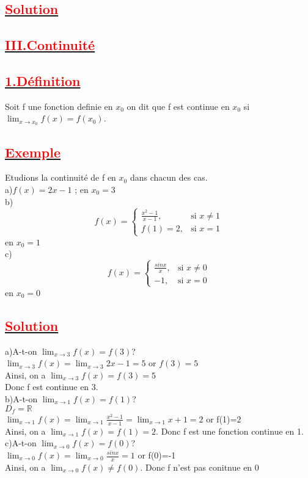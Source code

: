 \documentclass[12pt]{article}
\begin{document}
\subsection*{\underline{\textbf{\textcolor{red}{Solution}}}}
\subsection*{\underline{\textbf{\textcolor{red}{III.Continuité}}}}
\subsection*{\underline{\textbf{\textcolor{red}{1.Définition}}}}
Soit f une fonction definie en $x_{0}$ on dit que f est continue en $x_{0}$ si
$\lim_{x \to x_{0}} f(x)=f(x_{0})$.
\subsection*{\underline{\textbf{\textcolor{red}{Exemple}}}}
Etudions la continuité de f en $x_{0}$ dans chacun des cas.\\
a)$f(x)=2x-1$ ; en $x_{0}=3$\\
b)\[ f(x) = \begin{cases} 
  \frac{x^2-1}{x-1}, & \text{si } x \neq 1 \\
  f(1)=2, & \text{si } x = 1 
\end{cases} \]
en $x_{0}=1$\\
c)\[ f(x) = \begin{cases} 
  \frac{sinx}{x}, & \text{si } x \neq 0 \\
  -1, & \text{si } x=0 
\end{cases} \]
en $x_{0}=0$
\subsection*{\underline{\textbf{\textcolor{red}{Solution}}}}
a)A-t-on $\lim_{x \to 3}f(x)=f(3)$?\\
$\lim_{x \to 3}f(x)=\lim_{x \to 3}2x-1=5$ or $f(3)=5$\\
Ainsi, on a $\lim_{x \to 3}f(x)=f(3)=5$\\
Donc f est continue en 3.\\
b)A-t-on $\lim_{x \to 1}f(x)=f(1)$?\\
$D_{f}=\mathbb{R}$\\
$\lim_{x \to 1}f(x)=\lim_{x \to 1}\frac{x^2-1}{x-1}=\lim_{x \to 1}x+1=2$ or f(1)=2\\
Ainsi, on a $\lim_{x \to 1}f(x)=f(1)=2$. Donc f est une fonction continue en 1.
c)A-t-on $\lim_{x \to 0}f(x)=f(0)$?\\
$\lim_{x \to 0}f(x)=\lim_{x \to 0}\frac{sinx}{x}=1$ or f(0)=-1\\
Ainsi, on a $\lim_{x \to 0}f(x) \neq f(0)$. Donc f n'est pas conitnue en 0
\end{document}
